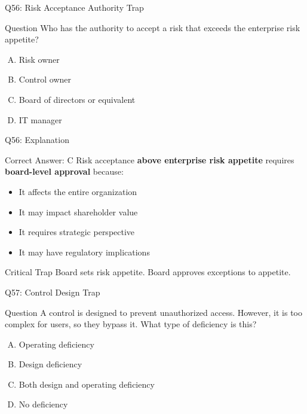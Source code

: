 \documentclass{beamer}
\begin{document}
	\begin{frame}{Q56: Risk Acceptance Authority Trap}
		\begin{block}{Question}
			Who has the authority to accept a risk that exceeds the enterprise risk appetite?
		\end{block}
		\begin{enumerate}[(A)]
			\item Risk owner
			\item Control owner
			\item Board of directors or equivalent
			\item IT manager
		\end{enumerate}
	\end{frame}
	
	\begin{frame}{Q56: Explanation}
		\begin{block}{Correct Answer: C}
			Risk acceptance \textbf{above enterprise risk appetite} requires \textbf{board-level approval} because:
			\begin{itemize}
				\item It affects the entire organization
				\item It may impact shareholder value
				\item It requires strategic perspective
				\item It may have regulatory implications
			\end{itemize}
		\end{block}
		\begin{alertblock}{Critical Trap}
			Board sets risk appetite.
			Board approves exceptions to appetite.
		\end{alertblock}
	\end{frame}
	
	\begin{frame}{Q57: Control Design Trap}
		\begin{block}{Question}
			A control is designed to prevent unauthorized access. However, it is too complex for users, so they bypass it. What type of deficiency is this?
		\end{block}
		\begin{enumerate}[(A)]
			\item Operating deficiency
			\item Design deficiency
			\item Both design and operating deficiency
			\item No deficiency
		\end{enumerate}
	\end{frame}
	
\end{document}
